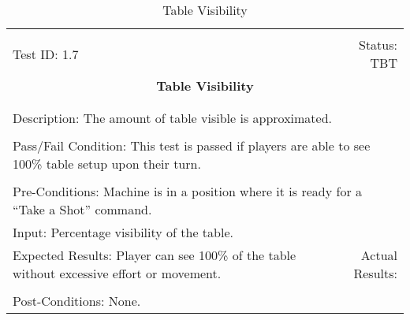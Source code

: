 \documentclass[titlepage]{article}
\begin{document}
\begin{center}%
\begin{table}[h!]
\begin{tabular}{|l r|}\hline&\\[-2mm]
	Test ID: 1.7	&Status: TBT\\[-3mm]
	\multicolumn{2}{|c|}{\textbf{\large{Table Visibility}}}\\&\\\hline&\\[-3mm]
	\multicolumn{2}{|p{\textwidth}|}{Description: The amount of table visible is approximated.}\\[1mm]\hline&\\[-3mm]
	\multicolumn{2}{|p{\textwidth}|}{Pass/Fail Condition: This test is passed if players are able to see 100\% table setup upon their turn.}\\[1mm]\hline&\\[-3mm]
	\multicolumn{2}{|p{\textwidth}|}{Pre-Conditions: Machine is in a position where it is ready for a ``Take a Shot'' command.}\\[4mm]
	\multicolumn{2}{|p{\textwidth}|}{Input: Percentage visibility of the table.}\\[2mm]\hline
	\multicolumn{1}{|p{0.49\textwidth}}{Expected Results: Player can see 100\% of the table without excessive effort or movement.}	&\multicolumn{1}{|p{0.45\textwidth}|}{Actual Results:}\\\hline&\\[-3mm]
	\multicolumn{2}{|p{\textwidth}|}{Post-Conditions: None.}\\\hline
\end{tabular}
\caption{Table Visibility}
\end{table}
\end{center}
\end{document}

